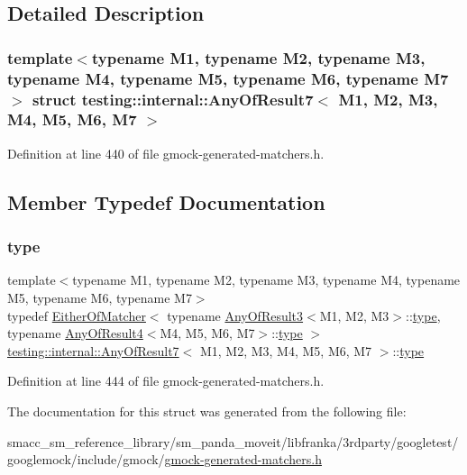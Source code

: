 \subsection{Detailed Description}
\subsubsection*{template$<$typename M1, typename M2, typename M3, typename M4, typename M5, typename M6, typename M7$>$\newline
struct testing\+::internal\+::\+Any\+Of\+Result7$<$ M1, M2, M3, M4, M5, M6, M7 $>$}



Definition at line 440 of file gmock-\/generated-\/matchers.\+h.



\subsection{Member Typedef Documentation}
\mbox{\label{structtesting_1_1internal_1_1AnyOfResult7_a976873478921520833464a86f840abe8}} 
\subsubsection{\texorpdfstring{type}{type}}
{\footnotesize\ttfamily template$<$typename M1, typename M2, typename M3, typename M4, typename M5, typename M6, typename M7$>$ \\
typedef \hyperlink{classtesting_1_1internal_1_1EitherOfMatcher}{Either\+Of\+Matcher}$<$ typename \hyperlink{structtesting_1_1internal_1_1AnyOfResult3}{Any\+Of\+Result3}$<$M1, M2, M3$>$\+::\hyperlink{structtesting_1_1internal_1_1AnyOfResult7_a976873478921520833464a86f840abe8}{type}, typename \hyperlink{structtesting_1_1internal_1_1AnyOfResult4}{Any\+Of\+Result4}$<$M4, M5, M6, M7$>$\+::\hyperlink{structtesting_1_1internal_1_1AnyOfResult7_a976873478921520833464a86f840abe8}{type} $>$ \hyperlink{structtesting_1_1internal_1_1AnyOfResult7}{testing\+::internal\+::\+Any\+Of\+Result7}$<$ M1, M2, M3, M4, M5, M6, M7 $>$\+::\hyperlink{structtesting_1_1internal_1_1AnyOfResult7_a976873478921520833464a86f840abe8}{type}}



Definition at line 444 of file gmock-\/generated-\/matchers.\+h.



The documentation for this struct was generated from the following file\+:\begin{DoxyCompactItemize}
\item 
smacc\+\_\+sm\+\_\+reference\+\_\+library/sm\+\_\+panda\+\_\+moveit/libfranka/3rdparty/googletest/googlemock/include/gmock/\hyperlink{gmock-generated-matchers_8h}{gmock-\/generated-\/matchers.\+h}\end{DoxyCompactItemize}
